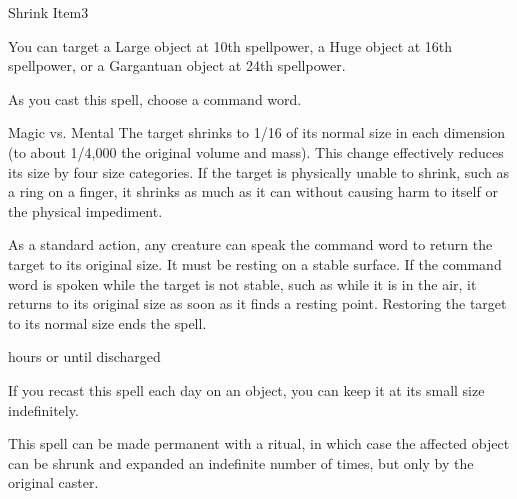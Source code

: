 \begin{spellsection}{Shrink Item}{3}
    \begin{spellheader}
    \end{spellheader}
    \begin{spellcontent}
        \begin{spelltargetinginfo}
            \spellspecial You can target a Large object at 10th spellpower, a Huge object at 16th spellpower, or a Gargantuan object at 24th spellpower.
        \end{spelltargetinginfo}
        \begin{spelleffects}
            \spellspecial As you cast this spell, choose a command word.
            \begin{spellattack}{Magic vs. Mental}
                \spellsuccess The target shrinks to 1/16 of its normal size in each dimension (to about 1/4,000 the original volume and mass). This change effectively reduces its size by four size categories. If the target is physically unable to shrink, such as a ring on a finger, it shrinks as much as it can without causing harm to itself or the physical impediment.

                As a standard action, any creature can speak the command word to return the target to its original size. It must be resting on a stable surface. If the command word is spoken while the target is not stable, such as while it is in the air, it returns to its original size as soon as it finds a resting point. Restoring the target to its normal size ends the spell.
            \end{spellattack}
             hours or until discharged
        \end{spelleffects}
    \end{spellcontent}
    \begin{spellfooter}
        \spellnotes  If you recast this spell each day on an object, you can keep it at its small size indefinitely.

        This spell can be made permanent with a  ritual, in which case the affected object can be shrunk and expanded an indefinite number of times, but only by the original caster.
        \miscastrandom
    \end{spellfooter}
\end{spellsection}

